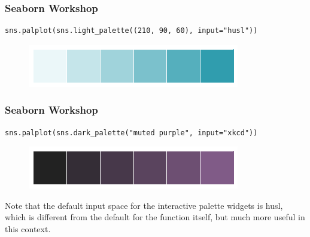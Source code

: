 \documentclass{beamer}
\begin{document}
\begin{frame}[fragile]
	\frametitle{Seaborn Workshop}
	\large
	\begin{verbatim}
sns.palplot(sns.light_palette((210, 90, 60), input="husl"))
\end{verbatim}
\begin{figure}
\centering
\includegraphics[width=0.7\linewidth]{images/color_palettes_50_0}
\caption{}
\label{fig:color_palettes_50_0}
\end{figure}

\end{frame}
\begin{frame}[fragile]
	\frametitle{Seaborn Workshop}
	\large
\begin{verbatim}
sns.palplot(sns.dark_palette("muted purple", input="xkcd"))
\end{verbatim}
\begin{figure}
	\centering
	\includegraphics[width=0.7\linewidth]{images/color_palettes_51_0}
\end{figure}

Note that the default input space for the interactive palette widgets is husl, which is different from the default for the function itself, but much more useful in this context.
\end{frame}
\end{document}
